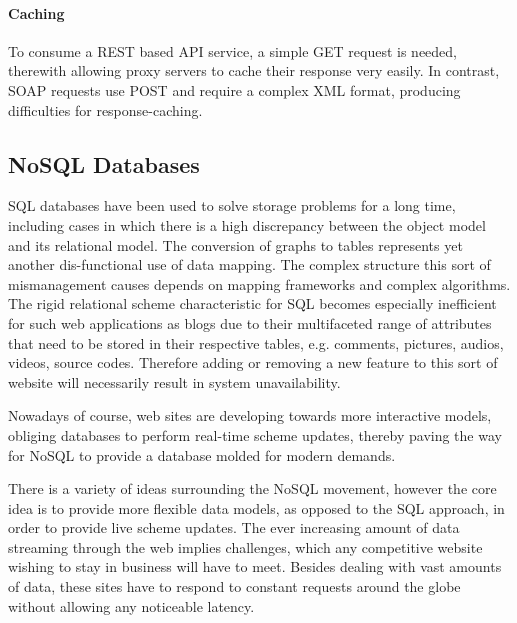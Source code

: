 \paragraph{Caching}

To consume a \ac{REST} based \ac{API} service, a simple GET request is needed, therewith allowing proxy servers to cache their response very easily. In contrast, \ac{SOAP} requests use POST and require a complex \ac{XML} format, producing difficulties for response-caching.

\subsection{NoSQL Databases \label{sec:back_da_per}}
\ac{SQL} databases have been used to solve storage problems for a long time, including cases in which there is a high discrepancy between the object model and its relational model. The conversion of graphs to tables represents yet another dis-functional use of data mapping. The complex structure this sort of mismanagement causes depends on mapping frameworks and complex algorithms. The rigid relational scheme characteristic for \ac{SQL} becomes especially inefficient for such web applications as blogs due to their multifaceted range of attributes that need to be stored in their respective tables, e.g. comments, pictures, audios, videos, source codes. Therefore adding or removing a new feature to this sort of website will necessarily result in system unavailability.          

Nowadays of course,  web sites are developing towards more interactive models, obliging databases to perform real-time scheme updates, thereby paving the way for \ac{NoSQL} to provide a database molded for modern demands. %


There is a variety of ideas surrounding the \ac{NoSQL} movement, however the core idea is to provide more flexible data models, as opposed to the \ac{SQL} approach, in order to provide live scheme updates. The ever increasing amount of data streaming through the web implies challenges, which any competitive website wishing to stay in business will have to meet. Besides dealing with vast amounts of data, these sites have to respond to constant requests around the globe without allowing any noticeable latency.

